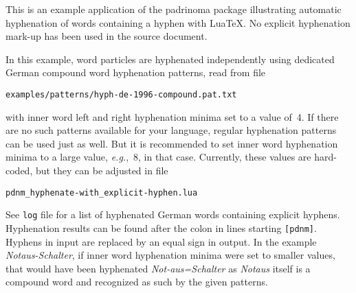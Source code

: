 \documentclass{article}
\begin{document}
This is an example application of the padrinoma package illustrating
automatic hyphenation of words containing a hyphen with Lua\TeX.  No
explicit hyphenation mark-up has been used in the source document.

In this example, word particles are hyphenated independently using
dedicated German compound word hyphenation patterns, read from file
\begin{center}
\verb+examples/patterns/hyph-de-1996-compound.pat.txt+
\end{center}
with inner word left and right hyphenation minima set to a value of~4.
If there are no such patterns available for your language, regular
hyphenation patterns can be used just as well.  But it is recommended to
set inner word hyphenation minima to a large value, \emph{e.g.},~8, in
that case.  Currently, these values are hard-coded, but they can be
adjusted in file
\begin{center}
\verb+pdnm_hyphenate-with_explicit-hyphen.lua+
\end{center}

See \texttt{log} file for a list of hyphenated German words containing
explicit hyphens.  Hyphenation results can be found after the colon in
lines starting \verb+[pdnm]+.  Hyphens in input are replaced by an equal
sign in output.  In the example \emph{Notaus-Schalter}, if inner word
hyphenation minima were set to smaller values, that would have been
hyphenated \emph{Not-aus=Schalter} as \emph{Notaus} itself is a compound
word and recognized as such by the given patterns.

\begin{otherlanguage}{ngerman}
\end{otherlanguage}
\end{document}

